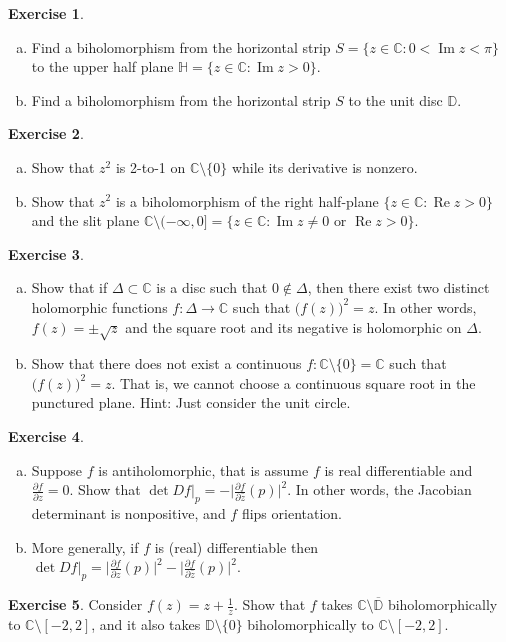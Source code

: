 \documentclass[12pt,openany]{book}
\renewcommand{\Re}{\operatorname{Re}}
\renewcommand{\Im}{\operatorname{Im}}
\newcommand{\babs}[1]{\bigl\lvert {#1} \bigr\rvert}
\newcommand{\C}{{\mathbb{C}}}
\newcommand{\D}{{\mathbb{D}}}
\newcommand{\bH}{{\mathbb{H}}}
\theoremstyle{plain}
\theoremstyle{remark}
\theoremstyle{definition}
\newenvironment{exbox}{%
    \def\FrameCommand{\vrule width 1pt \relax\hspace {10pt}}%
    \MakeFramed {\advance \hsize -\width \FrameRestore }%
}{%
    \endMakeFramed
}
\newenvironment{exparts}{%
    \leavevmode\begin{enumerate}[a),noitemsep,topsep=0pt,parsep=0pt,partopsep=0pt]
}{%
    \end{enumerate}
}
\theoremstyle{exercise}
\newtheorem{exercise}{Exercise}[section]
\theoremstyle{example}
\begin{document}
\begin{exbox}
\begin{exercise}
\begin{exparts}
\item
Find a biholomorphism from the horizontal strip
$S = \{ z \in \C : 0 < \Im z < \pi \}$ to
the upper half plane $\bH = \{ z \in \C : \Im z > 0 \}$.
\item
Find a biholomorphism from the horizontal strip
$S$ to the unit disc $\D$.
\end{exparts}
\end{exercise}

\begin{exercise}
\begin{exparts}
\item
Show that $z^2$ is 2-to-1 on $\C \setminus \{ 0 \}$ while its
derivative is nonzero.
\item
Show that $z^2$ is a biholomorphism of the right half-plane
$\{ z \in \C : \Re z > 0 \}$
and the slit plane $\C \setminus (-\infty,0] = \{ z \in \C : \Im z \not= 0 \text{ or } \Re z > 0 \}$.
\end{exparts}
\end{exercise}

\begin{exercise}
\begin{exparts}
\item
Show that if $\Delta \subset \C$ is a disc such that $0 \notin \Delta$, then
there exist two distinct holomorphic functions $f \colon \Delta \to \C$ such that
${\bigl(f(z)\bigr)}^2 = z$.  In other words, $f(z) = \pm \sqrt{z}$ and the
square root and its negative is holomorphic on $\Delta$.
\item
Show that there does not exist a continuous $f \colon \C \setminus \{ 0 \} =
\C$ such that ${\bigl(f(z)\bigr)}^2 = z$.  That is, we cannot choose a
continuous square root in the punctured plane.  Hint: Just consider the unit
circle.
\end{exparts}
\end{exercise}

\begin{exercise}
\begin{exparts}
\item
Suppose $f$ is antiholomorphic, that is assume $f$ is real differentiable
and $\frac{\partial f}{\partial z} = 0$.  Show that
$\det Df\big|_p = - \babs{\frac{\partial f}{\partial \bar{z}}(p)}^2$.  In other words,
the Jacobian determinant is nonpositive, and $f$ flips orientation.
\item
More generally, if $f$ is (real) differentiable then
$\det Df\big|_p = \babs{\frac{\partial f}{\partial z}(p)}^2 -
\babs{\frac{\partial f}{\partial \bar{z}}(p)}^2$.
\end{exparts}
\end{exercise}

\begin{exercise} \label{exercise:segmentcomplement}
Consider $f(z) = z+ \frac{1}{z}$.  Show that $f$ takes $\C \setminus
\overline{\D}$ biholomorphically to $\C \setminus [-2,2]$, and it also takes
$\D \setminus \{ 0 \}$ biholomorphically to $\C \setminus [-2,2]$.
\end{exercise}
\end{exbox}
\end{document}
